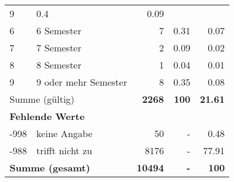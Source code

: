 \begin{longtable}{lXrrr}
       \num{9} &
       \num[round-mode=places,round-precision=2]{0,4} &
         \num[round-mode=places,round-precision=2]{0,09} \\

     6 &
     \multicolumn{1}{X}{ 6 Semester   } &


       \num{7} &
       \num[round-mode=places,round-precision=2]{0,31} &
         \num[round-mode=places,round-precision=2]{0,07} \\

     7 &
     \multicolumn{1}{X}{ 7 Semester   } &


       \num{2} &
       \num[round-mode=places,round-precision=2]{0,09} &
         \num[round-mode=places,round-precision=2]{0,02} \\

     8 &
     \multicolumn{1}{X}{ 8 Semester   } &


       \num{1} &
       \num[round-mode=places,round-precision=2]{0,04} &
         \num[round-mode=places,round-precision=2]{0,01} \\

     9 &
     \multicolumn{1}{X}{ 9 oder mehr Semester   } &


       \num{8} &
       \num[round-mode=places,round-precision=2]{0,35} &
         \num[round-mode=places,round-precision=2]{0,08} \\
     \midrule
     \multicolumn{2}{l}{Summe (gültig)} &
       \textbf{\num{2268}} &
     \textbf{100} &
       \textbf{\num[round-mode=places,round-precision=2]{21,61}} \\
     \multicolumn{5}{l}{\textbf{Fehlende Werte}}\\
       -998 &
       keine Angabe &
         \num{50} &
        - &
         \num[round-mode=places,round-precision=2]{0,48} \\
       -988 &
       trifft nicht zu &
         \num{8176} &
        - &
         \num[round-mode=places,round-precision=2]{77,91} \\
     \midrule
     \multicolumn{2}{l}{\textbf{Summe (gesamt)}} &
          \textbf{\num{10494}} &
        \textbf{-} &
        \textbf{100} \\
     \bottomrule
     \end{longtable}
     
